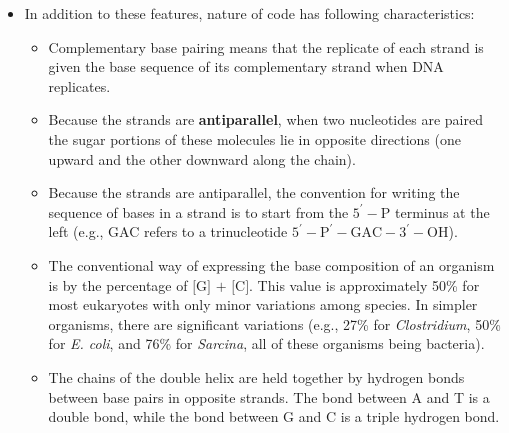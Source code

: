 \documentclass[11pt,ignorenonframetext,aspectratio=169]{beamer}
\providecommand{\tightlist}{%
  \setlength{\itemsep}{0pt}\setlength{\parskip}{0pt}}
\begin{document}
\begin{frame}{}
\protect\hypertarget{section-3}{}

\begin{itemize}
\tightlist
\item
  In addition to these features, nature of code has following
  characteristics:

  \begin{itemize}
  \tightlist
  \item
    Complementary base pairing means that the replicate of each strand
    is given the base sequence of its complementary strand when DNA
    replicates.
  \item
    Because the strands are \textbf{antiparallel}, when two nucleotides
    are paired the sugar portions of these molecules lie in opposite
    directions (one upward and the other downward along the chain).
  \item
    Because the strands are antiparallel, the convention for writing the
    sequence of bases in a strand is to start from the
    \(\mathrm{5^{\prime}-P}\) terminus at the left (e.g., GAC refers to
    a trinucleotide \(\mathrm{5^\prime-P^{\prime}-GAC-3^\prime-OH}\)).
  \item
    The conventional way of expressing the base composition of an
    organism is by the percentage of \(\text{[G] + [C]}\). This value is
    approximately 50\% for most eukaryotes with only minor variations
    among species. In simpler organisms, there are significant
    variations (e.g., 27\% for \emph{Clostridium}, 50\% for \emph{E.
    coli}, and 76\% for \emph{Sarcina}, all of these organisms being
    bacteria).
  \item
    The chains of the double helix are held together by hydrogen bonds
    between base pairs in opposite strands. The bond between A and T is
    a double bond, while the bond between G and C is a triple hydrogen
    bond.
  \end{itemize}
\end{itemize}

\end{frame}
\end{document}
